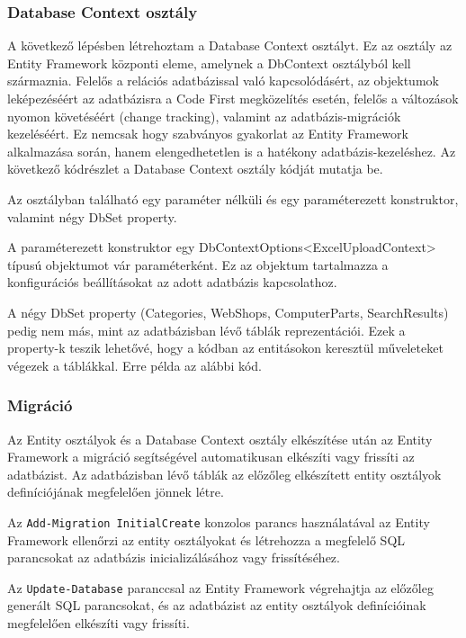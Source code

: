\documentclass[
]{thesis-ekf}
\theoremstyle{definition}
\theoremstyle{remark}
\begin{document}
\subsubsection{Database Context osztály}
A következő lépésben létrehoztam a Database Context osztályt. Ez az osztály az Entity Framework központi eleme, amelynek a DbContext osztályból kell származnia. Felelős a relációs adatbázissal való kapcsolódásért, az objektumok leképezéséért az adatbázisra a Code First megközelítés esetén, felelős a változások nyomon követéséért (change tracking), valamint az adatbázis-migrációk kezeléséért. Ez nemcsak hogy szabványos gyakorlat az Entity Framework alkalmazása során, hanem elengedhetetlen is a hatékony adatbázis-kezeléshez. Az következő kódrészlet a  Database Context osztály kódját mutatja be.


Az osztályban található egy paraméter nélküli és egy paraméterezett konstruktor, valamint négy DbSet property. 

A paraméterezett konstruktor egy DbContextOptions<ExcelUploadContext> típusú objektumot vár paraméterként. Ez az objektum tartalmazza a konfigurációs beállításokat az adott adatbázis kapcsolathoz.

A négy DbSet property (Categories, WebShops, ComputerParts, SearchResults) pedig nem más, mint az adatbázisban lévő táblák reprezentációi. Ezek a property-k teszik lehetővé, hogy a kódban az entitásokon keresztül műveleteket végezek a táblákkal. Erre példa az alábbi kód.



\subsubsection{Migráció}
Az Entity osztályok és a Database Context osztály elkészítése után az Entity Framework a migráció segítségével automatikusan elkészíti vagy frissíti az adatbázist. Az adatbázisban lévő táblák az előzőleg elkészített entity osztályok definíciójának megfelelően jönnek létre.

Az \texttt{Add-Migration InitialCreate} konzolos parancs használatával az Entity Framework ellenőrzi az entity osztályokat és létrehozza a megfelelő SQL parancsokat az adatbázis inicializálásához vagy frissítéséhez.

Az \texttt{Update-Database} paranccsal az Entity Framework végrehajtja az előzőleg generált SQL parancsokat, és az adatbázist az entity osztályok definícióinak megfelelően elkészíti vagy frissíti.
\end{document}

